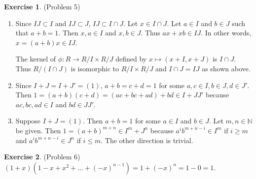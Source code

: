 \documentclass[12pt, psamsfonts]{amsart}
\theoremstyle{definition}
\newtheorem*{exer}{Exercise}
\theoremstyle{remark}
\numberwithin{equation}{section}
\begin{document}
\begin{exer}{(Problem 5)}
  \begin{enumerate}
    \item 
      Since $IJ \subset I$ and $IJ \subset J$, $IJ \subset I \cap J$.
      Let $x \in I \cap J$.
      Let $a \in I$ and $b \in J$ such that $a + b = 1$.
      Then $x, a \in I$ and $x, b \in J$.
      Thus $ax + xb \in IJ$.
      In other words, $x = (a + b)x \in IJ$.

      The kernel of $\phi: R \rightarrow R / I \times R / J$ defined by $x \mapsto (x + I, x + J)$ is $I \cap J$.
      Thus $R / (I \cap J)$ is isomorphic to $R / I \times R / J$ and $I \cap J = IJ$ as shown above.
    \item
      Since $I + J = I + J' = (1)$, $a + b = c + d = 1$ for some $a, c \in I, b \in J, d \in J'$.
      Then $1 = (a + b)(c + d) = (ac + bc + ad) + bd \in I + JJ'$ because $ac, bc, ad \in I$ and $bd \in JJ'$.
    \item
      Suppose $I + J = (1)$.
      Then $a + b = 1$ for some $a \in I$ and $b \in J$.
      Let $m, n \in \mathbb{N}$ be given.
      Then $1 = (a + b)^{m + n} \in I^m + J^n$ because $a^ib^{m + n - i} \in I^m$ if $i \geq m$ and $a^ib^{m + n - i} \in J^n$ if $i \leq m$.
      The other direction is trivial.
  \end{enumerate}
\end{exer}

\begin{exer}{(Problem 6)}
  $(1 + x)(1 - x + x^2 + ... + (-x)^{n - 1}) = 1 + (-x)^n = 1 - 0 = 1$.
\end{exer}
\end{document}
